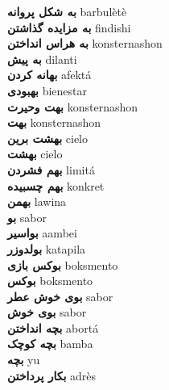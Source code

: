 \textbf{ به شکل پروانه  } barbulètè \\
\textbf{ به مزایده گذاشتن  } findishi \\
\textbf{ به هراس انداختن  } konsternashon \\
\textbf{ به پیش  } dilanti \\
\textbf{ بهانه کردن  } afektá \\
\textbf{ بهبودی  } bienestar \\
\textbf{ بهت وحیرت  } konsternashon \\
\textbf{ بهت  } konsternashon \\
\textbf{ بهشت برین  } cielo \\
\textbf{ بهشت  } cielo \\
\textbf{ بهم فشردن  } limitá \\
\textbf{ بهم چسبیده  } konkret \\
\textbf{ بهمن  } lawina \\
\textbf{ بو  } sabor \\
\textbf{ بواسیر  } aambei \\
\textbf{ بولدوزر  } katapila \\
\textbf{ بوکس بازی  } boksmento \\
\textbf{ بوکس  } boksmento \\
\textbf{ بوی خوش عطر  } sabor \\
\textbf{ بوی خوش  } sabor \\
\textbf{ بچه انداختن  } abortá \\
\textbf{ بچه کوچک  } bamba \\
\textbf{ بچه  } yu \\
\textbf{ بکار پرداختن  } adrès \\

